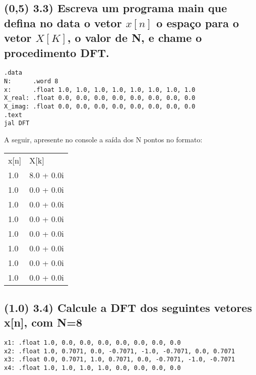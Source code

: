 \documentclass{article}
\begin{document}
\subsection*{(0,5) 3.3) Escreva um programa main que defina no data o vetor $x[n]$ o espaço para o vetor $X[K]$, o valor de N, e chame o procedimento DFT.}
\begin{verbatim}
.data
N:      .word 8
x:      .float 1.0, 1.0, 1.0, 1.0, 1.0, 1.0, 1.0, 1.0
X_real: .float 0.0, 0.0, 0.0, 0.0, 0.0, 0.0, 0.0, 0.0
X_imag: .float 0.0, 0.0, 0.0, 0.0, 0.0, 0.0, 0.0, 0.0
.text
jal DFT
\end{verbatim}
A seguir, apresente no console a saída dos N pontos no formato: \\
\begin{tabular}{ll}
x[n] & X[k] \\
1.0 & 8.0 + 0.0i \\
1.0 & 0.0 + 0.0i \\
1.0 & 0.0 + 0.0i \\
1.0 & 0.0 + 0.0i \\
1.0 & 0.0 + 0.0i \\
1.0 & 0.0 + 0.0i \\
1.0 & 0.0 + 0.0i \\
1.0 & 0.0 + 0.0i \\
\end{tabular}

\subsection*{(1.0) 3.4) Calcule a DFT dos seguintes vetores x[n], com N=8}
\begin{verbatim}
x1: .float 1.0, 0.0, 0.0, 0.0, 0.0, 0.0, 0.0, 0.0
x2: .float 1.0, 0.7071, 0.0, -0.7071, -1.0, -0.7071, 0.0, 0.7071
x3: .float 0.0, 0.7071, 1.0, 0.7071, 0.0, -0.7071, -1.0, -0.7071
x4: .float 1.0, 1.0, 1.0, 1.0, 0.0, 0.0, 0.0, 0.0
\end{verbatim}
\end{document}
